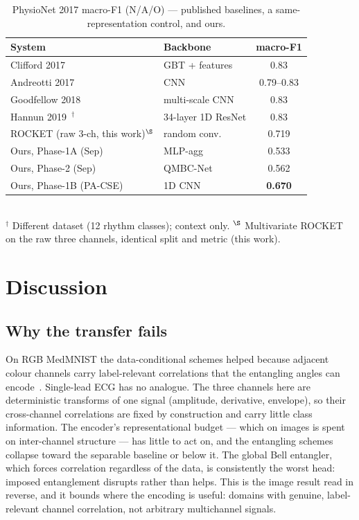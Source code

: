 \documentclass[conference,compsoc]{IEEEtran}
\begin{document}
\begin{table}[t]
\caption{PhysioNet 2017 macro-F1 (N/A/O) --- published baselines, a same-representation control, and ours.}
\label{tab:sota}
\centering
\begin{tabular}{llc}
\toprule
System & Backbone & macro-F1 \\
\midrule
Clifford 2017~\cite{clifford2017af}          & GBT + features      & 0.83 \\
Andreotti 2017~\cite{andreotti2017comparing} & CNN                 & 0.79--0.83 \\
Goodfellow 2018~\cite{goodfellow2018towards} & multi-scale CNN     & 0.83 \\
Hannun 2019~\cite{hannun2019cardiologist}$^\dagger$ & 34-layer 1D ResNet & 0.83 \\
\midrule
ROCKET (raw 3-ch, this work)$^\S$ & random conv.        & 0.719 \\
Ours, Phase-1A (Sep)             & MLP-agg             & 0.533 \\
Ours, Phase-2 (Sep)              & QMBC-Net            & 0.562 \\
Ours, Phase-1B (PA-CSE)          & 1D CNN              & \textbf{0.670} \\
\bottomrule
\end{tabular}\\[2pt]
\footnotesize $^\dagger$ Different dataset (12 rhythm classes); context only.
$^\S$ Multivariate ROCKET~\cite{dempster2020rocket} on the raw three channels, identical split and metric (this work).
\end{table}

\section{Discussion}
\label{sec:discussion}

\subsection{Why the transfer fails}

On RGB MedMNIST the data-conditional schemes helped because adjacent colour channels carry label-relevant correlations that the entangling angles can encode~\cite{atadana2026qpie}. Single-lead ECG has no analogue. The three channels here are deterministic transforms of one signal (amplitude, derivative, envelope), so their cross-channel correlations are fixed by construction and carry little class information. The encoder's representational budget --- which on images is spent on inter-channel structure --- has little to act on, and the entangling schemes collapse toward the separable baseline or below it. The global Bell entangler, which forces correlation regardless of the data, is consistently the worst head: imposed entanglement disrupts rather than helps. This is the image result read in reverse, and it bounds where the encoding is useful: domains with genuine, label-relevant channel correlation, not arbitrary multichannel signals.
\end{document}
